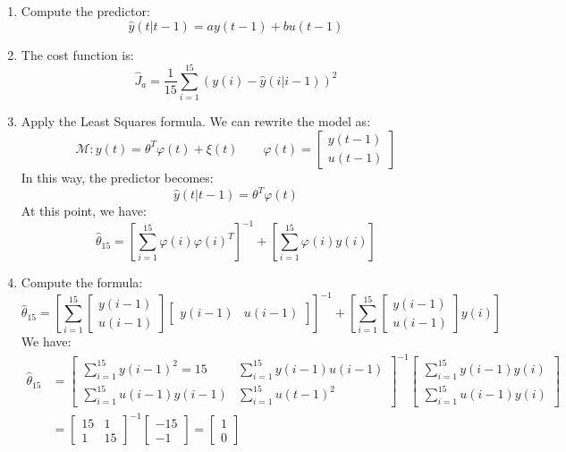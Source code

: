 \begin{enumerate}
    \item Compute the predictor: 
        \[\hat{y}(t|t-1)=ay(t-1)+bu(t-1)\]
    \item The cost function is: 
        \[\hat{J}_a=\dfrac{1}{15}\sum_{i=1}^{15}\left(y(i)-\hat{y}(i|i-1)\right)^2\]
    \item Apply the Least Squares formula.
        We can rewrite the model as:
        \[\mathcal{M}:y(t)=\theta^T\varphi(t)+\xi(t)\qquad \varphi(t)=\begin{bmatrix}y(t-1) \\ u(t-1) \end{bmatrix}\]
        In this way, the predictor becomes:
        \[\hat{y}(t|t-1)=\theta^T\varphi(t)\]
        At this point, we have:
        \[\hat{\theta}_{15}=\left[\sum_{i=1}^{15}\varphi(i)\varphi(i)^T\right]^{-1}+\left[\sum_{i=1}^{15}\varphi(i)y(i)\right]\]
    \item Compute the formula:
        \[\hat{\theta}_{15}=\left[\sum_{i=1}^{15}\begin{bmatrix}y(i-1) \\ u(i-1) \end{bmatrix}\begin{bmatrix}y(i-1) & u(i-1) \end{bmatrix}\right]^{-1}+\left[\sum_{i=1}^{15}\begin{bmatrix}y(i-1) \\ u(i-1) \end{bmatrix}y(i)\right]\]
        We have:
        \begin{align*}
            \hat{\theta}_15 &=\begin{bmatrix}
                                \sum_{i=1}^{15}y(i-1)^2=15 &  \sum_{i=1}^{15}y(i-1)u(i-1) \\
                                \sum_{i=1}^{15}u(i-1)y(i-1) & \sum_{i=1}^{15}u(t-1)^2
                            \end{bmatrix}^{-1} \begin{bmatrix}
                                \sum_{i=1}^{15}y(i-1)y(i) \\
                                \sum_{i=1}^{15}u(i-1)y(i)
                            \end{bmatrix} \\
                            &=\begin{bmatrix}
                                15 & 1 \\
                                1 & 15
                            \end{bmatrix}^{-1} \begin{bmatrix}
                                -15 \\
                                -1
                            \end{bmatrix}=\begin{bmatrix}
                                1 \\
                                0
                            \end{bmatrix}
        \end{align*}
\end{enumerate}